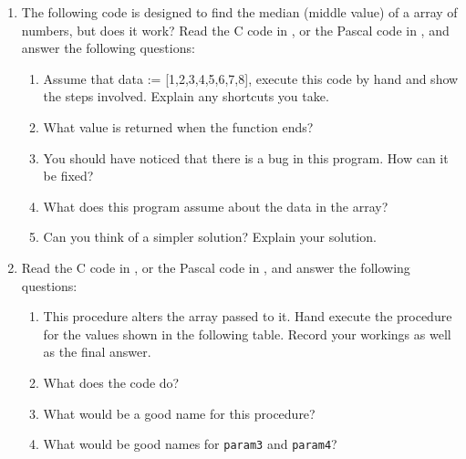\begin{enumerate}
\begin{enumerate}
      \end{enumerate}
  \begin{figure}[h]
  \end{figure}
  \begin{figure}[h]
  \end{figure}
  
  \clearpage
  \item The following code is designed to find the median (middle value) of a array of numbers, but does it work? Read the C code in , or the Pascal code in , and answer the following questions:
  \begin{enumerate}
    \item Assume that data := [1,2,3,4,5,6,7,8], execute this code by hand and show the steps involved. Explain any shortcuts you take.
    \item What value is returned when the function ends?
    \item You should have noticed that there is a bug in this program. How can it be fixed?
    \item What does this program assume about the data in the array?
    \item Can you think of a simpler solution? Explain your solution.
  \end{enumerate}
  \begin{figure}[h]
  \end{figure}
  \begin{figure}[h]
  \end{figure}

  \clearpage
  \item Read the C code in , or the Pascal code in , and answer the following questions:
  \begin{enumerate}
    \item This procedure alters the array passed to it. Hand execute the procedure for the values shown in the following table. Record your workings as well as the final answer.
    \item What does the code do?
    \item What would be a good name for this procedure?
    \item What would be good names for \texttt{param3} and \texttt{param4}?
    

\end{enumerate}
\end{enumerate}
